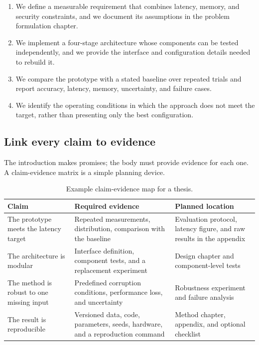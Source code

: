 \begin{keypoint}
\begin{enumerate}
  \item We define a measurable requirement that combines latency, memory, and
        security constraints, and we document its assumptions in the problem
        formulation chapter.
  \item We implement a four-stage architecture whose components can be tested
        independently, and we provide the interface and configuration details
        needed to rebuild it.
  \item We compare the prototype with a stated baseline over repeated trials
        and report accuracy, latency, memory, uncertainty, and failure cases.
  \item We identify the operating conditions in which the approach does not
        meet the target, rather than presenting only the best configuration.
\end{enumerate}
\end{keypoint}

\subsection{Link every claim to evidence}
The introduction makes promises; the body must provide evidence for each one.
A claim-evidence matrix is a simple planning device.

\begin{table}[htbp]
\centering
\caption{Example claim-evidence map for a thesis.}
\label{tab:guide-claim-evidence-en}
\begin{tabularx}{\textwidth}{p{}Yp{0.27\textwidth}}
\toprule
Claim & Required evidence & Planned location\\
\midrule
The prototype meets the latency target & Repeated measurements, distribution,
comparison with the baseline & Evaluation protocol, latency figure, and raw
results in the appendix\\
The architecture is modular & Interface definition, component tests, and a
replacement experiment & Design chapter and component-level tests\\
The method is robust to one missing input & Predefined corruption conditions,
performance loss, and uncertainty & Robustness experiment and failure analysis\\
The result is reproducible & Versioned data, code, parameters, seeds, hardware,
and a reproduction command & Method chapter, appendix, and optional checklist\\
\bottomrule
\end{tabularx}
\end{table}

